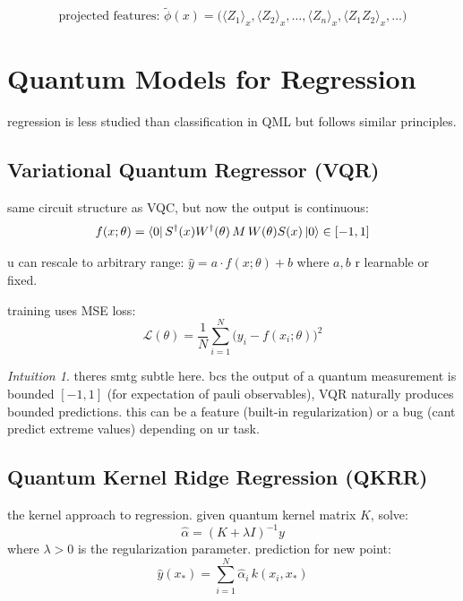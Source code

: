 \documentclass[11pt,a4paper]{article}
\theoremstyle{definition}
\theoremstyle{remark}
\newtheorem*{intuition}{Intuition}
\begin{document}
\begin{equation}
    \text{projected features: } \tilde{\phi}(x) = \big(\langle Z_1 \rangle_x, \langle Z_2 \rangle_x, \ldots, \langle Z_n \rangle_x, \langle Z_1 Z_2 \rangle_x, \ldots\big)
\end{equation}

\section{Quantum Models for Regression}

regression is less studied than classification in QML but follows similar principles.

\subsection{Variational Quantum Regressor (VQR)}

same circuit structure as VQC, but now the output is continuous:
\begin{equation}
    f(x; \theta) = \bra{0} S^\dagger(x) W^\dagger(\theta) \, M \, W(\theta) S(x) \ket{0} \in [-1, 1]
\end{equation}

u can rescale to arbitrary range: $\hat{y} = a \cdot f(x; \theta) + b$ where $a, b$ r learnable or fixed.

training uses MSE loss:
\begin{equation}
    \mathcal{L}(\theta) = \frac{1}{N} \sum_{i=1}^{N} \big(y_i - f(x_i; \theta)\big)^2
\end{equation}

\begin{intuition}
theres smtg subtle here. bcs the output of a quantum measurement is bounded $[-1, 1]$ (for expectation of pauli observables), VQR naturally produces bounded predictions. this can be a feature (built-in regularization) or a bug (cant predict extreme values) depending on ur task.
\end{intuition}

\subsection{Quantum Kernel Ridge Regression (QKRR)}

the kernel approach to regression. given quantum kernel matrix $K$, solve:
\begin{equation}
    \hat{\alpha} = (K + \lambda I)^{-1} y
\end{equation}
where $\lambda > 0$ is the regularization parameter. prediction for new point:
\begin{equation}
    \hat{y}(x_*) = \sum_{i=1}^{N} \hat{\alpha}_i \, k(x_i, x_*)
\end{equation}
\end{document}
